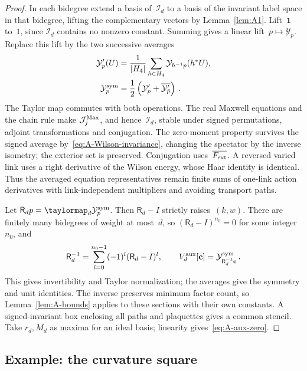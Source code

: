 \begin{proof}
In each bidegree extend a basis of~$\mathcal I_d$ to a basis of the invariant label space in that bidegree, lifting the complementary vectors by Lemma~\ref{lem:A1}. Lift~$\mathbf1$ to~$1$, since $\mathcal I_d$ contains no nonzero constant. Summing gives a linear lift~$p\mapsto\mathcal Y_p$. Replace this lift by the two successive averages
\begin{align*}
\mathcal Y'_p(U)&=\frac1{|H_4|}\sum_{h\in H_4}\mathcal Y_{h^{-1}p}(h^*U),\\
\mathcal Y^{\rm sym}_p&=\frac12\left(\mathcal Y'_p+\overline{\mathcal Y'_{\bar p}}\right)\,.
\end{align*}
The Taylor map commutes with both operations. The real Maxwell equations and the chain rule make $\mathcal J_j^{\rm Max}$, and hence~$\mathcal I_d$, stable under signed permutations, adjoint transformations and conjugation. The zero-moment property survives the signed average by~\eqref{eq:A-Wilson-invariance}, changing the spectator by the inverse isometry; the exterior set is preserved. Conjugation uses~$\overline{F_{\rm ext}}$. A reversed varied link uses a right derivative of the Wilson energy, whose Haar identity is identical. Thus the averaged equation representatives remain finite sums of one-link action derivatives with link-independent multipliers and avoiding transport paths.

Let $\mathsf R_dp=\taylormap_{d}\mathcal Y^{\rm sym}_p$. Then $\mathsf R_d-I$ strictly raises~$(k,w)$. There are finitely many bidegrees of weight at most~$d$, so $(\mathsf R_d-I)^{n_0}=0$ for some integer~$n_0$, and
\begin{equation*}
\mathsf R_d^{-1}=\sum_{l=0}^{n_0-1}(-1)^l(\mathsf R_d-I)^l,\qquad
V_d^{\rm aux}[\mathbf c]=\mathcal Y^{\rm sym}_{\mathsf R_d^{-1}\mathbf c}\,.
\end{equation*}
This gives invertibility and Taylor normalization; the averages give the symmetry and unit identities. The inverse preserves minimum factor count, so Lemma~\ref{lem:A-bounds} applies to these sections with their own constants. A signed-invariant box enclosing all paths and plaquettes gives a common stencil. Take $r_d,M_d$ as maxima for an ideal basis; linearity gives~\eqref{eq:A-aux-zero}.
\end{proof}

\subsection{Example: the curvature square}\label{sec:A-example}

